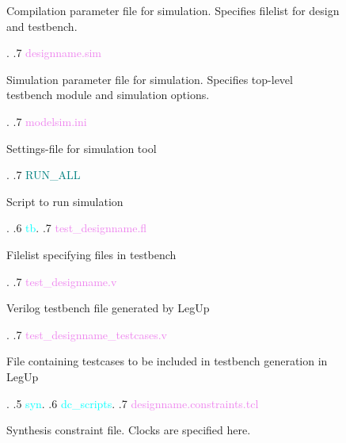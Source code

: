 \begin{figure}
\begin{minipage}{0.99\textwidth}
{\begin{minipage}[t]{6cm}
                                                            Compilation parameter file for simulation{.} Specifies filelist for design and testbench{.}
                                                            \end{minipage}.
    .7 \textcolor{violet}{designname{.}sim} \dotfill \:\:\begin{minipage}[t]{6cm}
                                                            Simulation parameter file for simulation{.} Specifies top-level testbench module and simulation options{.}
                                                            \end{minipage}.
    .7 \textcolor{violet}{modelsim{.}ini} \dotfill \:\:\begin{minipage}[t]{6cm}
                                                            Settings-file for simulation tool
                                                            \end{minipage}.
    .7 \textcolor{teal}{RUN\_ALL} \dotfill \:\:\begin{minipage}[t]{6cm}
                                                            Script to run simulation
                                                            \end{minipage}.
    .6 \textcolor{cyan}{tb}.
    .7 \textcolor{violet}{test\_designname{.}fl} \dotfill \:\:\begin{minipage}[t]{6cm}
                                                    Filelist specifying files in testbench
                                                    \end{minipage}.
    .7 \textcolor{violet}{test\_designname{.}v} \dotfill \:\:\begin{minipage}[t]{6cm}
                                                    Verilog testbench file generated by LegUp
                                                    \end{minipage}.
    .7 \textcolor{violet}{test\_designname\_testcases{.}v} \dotfill \:\:\begin{minipage}[t]{6cm}
                                                    File containing testcases to be included in testbench generation in LegUp
                                                    \end{minipage}.
    .5 \textcolor{cyan}{syn}.
    .6 \textcolor{cyan}{dc\_scripts}.
    .7 \textcolor{violet}{designname{.}constraints{.}tcl} \dotfill \:\:\begin{minipage}[t]{6cm}
                                                            Synthesis constraint file{.} Clocks are specified here{.}

\end{minipage}}
\end{minipage}
\end{figure}
